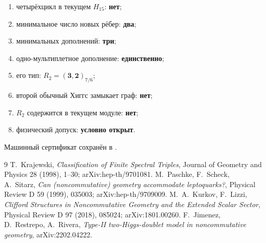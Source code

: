 \begin{protocol}
\begin{enumerate}
 \item четырёхцикл в текущем $H_{15}$: \textbf{нет};
 \item минимальное число новых рёбер: \textbf{два};
 \item минимальных дополнений: \textbf{три};
 \item одно-мультиплетное дополнение: \textbf{единственно};
 \item его тип: \textbf{$R_2=(\mathbf3,\mathbf2)_{7/6}$};
 \item второй обычный Хиггс замыкает граф: \textbf{нет};
 \item $R_2$ содержится в текущем модуле: \textbf{нет};
 \item физический допуск: \textbf{условно открыт}.
\end{enumerate}
\end{protocol}

Машинный сертификат сохранён в
.

\begin{thebibliography}{9}
T.~Krajewski, \emph{Classification of Finite Spectral Triples},
Journal of Geometry and Physics 28 (1998), 1--30; arXiv:hep-th/9701081.
M.~Paschke, F.~Scheck, A.~Sitarz,
\emph{Can (noncommutative) geometry accommodate leptoquarks?},
Physical Review D 59 (1999), 035003; arXiv:hep-th/9709009.
M.~A.~Kurkov, F.~Lizzi,
\emph{Clifford Structures in Noncommutative Geometry and the Extended Scalar Sector},
Physical Review D 97 (2018), 085024; arXiv:1801.00260.
F.~Jimenez, D.~Restrepo, A.~Rivera,
\emph{Type-II two-Higgs-doublet model in noncommutative geometry},
arXiv:2202.04222.
\end{thebibliography}